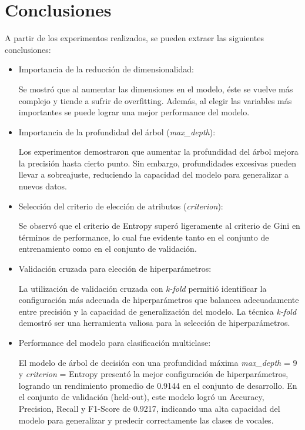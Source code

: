 \documentclass[11pt,a4paper, twocolumn]{article}
\begin{document}
\section{Conclusiones}

A partir de los experimentos realizados, se pueden extraer las siguientes conclusiones:

\begin{itemize}

\item
        Importancia de la reducción de dimensionalidad:

        Se mostró que al aumentar las dimensiones en el modelo, éste se vuelve más complejo y tiende a sufrir de overfitting. Además, al elegir las variables más importantes se puede lograr una mejor performance del modelo.

\item
	Importancia de la profundidad del árbol (\textit{max\_depth}):

	Los experimentos demostraron que aumentar la profundidad del árbol mejora la precisión hasta cierto punto. Sin embargo, profundidades excesivas pueden llevar a sobreajuste, reduciendo la capacidad del modelo para generalizar a nuevos datos.

\item
	Selección del criterio de elección de atributos (\textit{criterion}):

	Se observó que el criterio de Entropy superó ligeramente al criterio de Gini en términos de performance, lo cual fue evidente tanto en el conjunto de entrenamiento como en el conjunto de validación.

\item
	Validación cruzada para elección de hiperparámetros:

	La utilización de validación cruzada con \textit{k-fold} permitió identificar la configuración más adecuada de hiperparámetros que balancea adecuadamente entre precisión y la capacidad de generalización del modelo.  
	La técnica \textit{k-fold} demostró ser una herramienta valiosa para la selección de hiperparámetros.

\item
	Performance del modelo para clasificación multiclase:

	El modelo de árbol de decisión con una profundidad máxima \textit{max\_depth} = 9 y \textit{criterion} = Entropy presentó la mejor configuración de hiperparámetros, logrando un rendimiento promedio de 0.9144 en el conjunto de desarrollo.
	En el conjunto de validación (held-out), este modelo logró un Accuracy, Precision, Recall y F1-Score de 0.9217, indicando una alta capacidad del modelo para generalizar y predecir correctamente las clases de vocales. 

\end{itemize}
\end{document}
